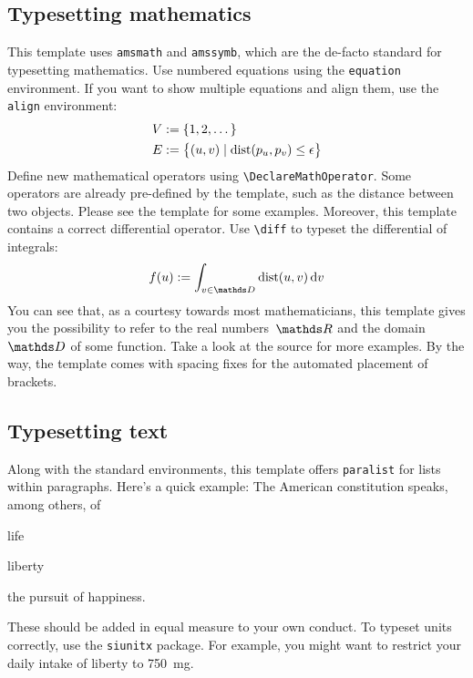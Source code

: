 \subsection{Typesetting mathematics}

This template uses \verb|amsmath| and \verb|amssymb|, which are the
de-facto standard for typesetting mathematics. Use numbered equations
using the \verb|equation| environment.
%
If you want to show multiple equations and align them, use the
\verb|align| environment:
%
\begin{align}
    V &:= \{ 1, 2, \dots \}\\
    E &:= \big\{ \left(u,v\right) \mid \dist\left(p_u, p_v\right) \leq \epsilon \big\}
\end{align}
%
Define new mathematical operators using \verb|\DeclareMathOperator|.
Some operators are already pre-defined by the template, such as the
distance between two objects. Please see the template for some examples. 
%
Moreover, this template contains a correct differential operator. Use \verb|\diff| to typeset the differential of integrals:
%
\begin{equation}
  f(u) := \int_{v \in \domain}\dist(u,v)\diff{v}
\end{equation}
%
You can see that, as a courtesy towards most mathematicians, this
template gives you the possibility to refer to the real numbers~$\real$
and the domain~$\domain$ of some function. Take a look at the source for
more examples. By the way, the template comes with spacing fixes for the
automated placement of brackets.

\subsection{Typesetting text}

Along with the standard environments, this template offers
\verb|paralist| for lists within paragraphs.
%
Here's a quick example: The American constitution speaks, among others, of
%
\begin{inparaenum}[(i)]
  \item life
  \item liberty
  \item the pursuit of happiness.
\end{inparaenum}
%
These should be added in equal measure to your own conduct. To typeset
units correctly, use the \verb|siunitx| package. For example, you might
want to restrict your daily intake of liberty to \SI{750}{\milli\gram}.


